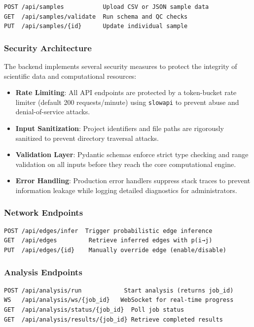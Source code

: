 \begin{verbatim}
POST /api/samples           Upload CSV or JSON sample data
GET  /api/samples/validate  Run schema and QC checks
PUT  /api/samples/{id}      Update individual sample
\end{verbatim}

\subsubsection{Security Architecture}

The backend implements several security measures to protect the integrity of scientific data and computational resources:

\begin{itemize}
	\item \textbf{Rate Limiting}: All API endpoints are protected by a token-bucket rate limiter (default 200 requests/minute) using \texttt{slowapi} to prevent abuse and denial-of-service attacks.
	\item \textbf{Input Sanitization}: Project identifiers and file paths are rigorously sanitized to prevent directory traversal attacks.
	\item \textbf{Validation Layer}: Pydantic schemas enforce strict type checking and range validation on all inputs before they reach the core computational engine.
	\item \textbf{Error Handling}: Production error handlers suppress stack traces to prevent information leakage while logging detailed diagnostics for administrators.
\end{itemize}

\subsubsection{Network Endpoints}


\begin{verbatim}
POST /api/edges/infer  Trigger probabilistic edge inference
GET  /api/edges         Retrieve inferred edges with p(i→j)
PUT  /api/edges/{id}    Manually override edge (enable/disable)
\end{verbatim}

\subsubsection{Analysis Endpoints}

\begin{verbatim}
POST /api/analysis/run            Start analysis (returns job_id)
WS   /api/analysis/ws/{job_id}   WebSocket for real-time progress
GET  /api/analysis/status/{job_id}  Poll job status
GET  /api/analysis/results/{job_id} Retrieve completed results
\end{verbatim}

